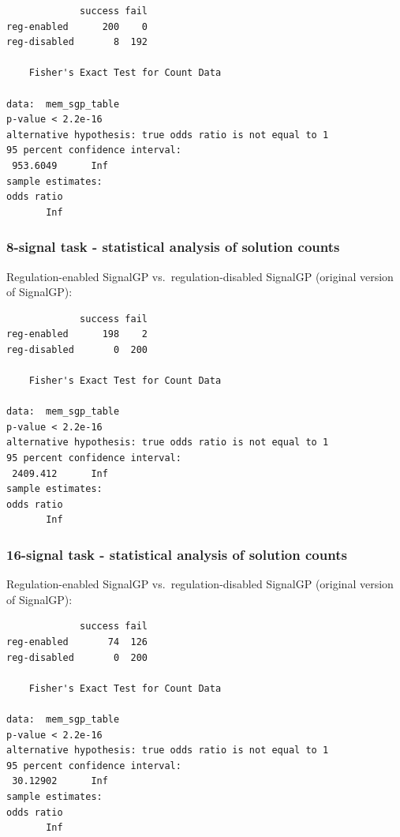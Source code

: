 \documentclass[
]{book}
\begin{document}
\begin{verbatim}
             success fail
reg-enabled      200    0
reg-disabled       8  192

    Fisher's Exact Test for Count Data

data:  mem_sgp_table
p-value < 2.2e-16
alternative hypothesis: true odds ratio is not equal to 1
95 percent confidence interval:
 953.6049      Inf
sample estimates:
odds ratio 
       Inf 
\end{verbatim}

\hypertarget{signal-task---statistical-analysis-of-solution-counts-2}{%
\subsubsection{8-signal task - statistical analysis of solution counts}\label{signal-task---statistical-analysis-of-solution-counts-2}}

Regulation-enabled SignalGP vs.~regulation-disabled SignalGP (original version of SignalGP):

\begin{verbatim}
             success fail
reg-enabled      198    2
reg-disabled       0  200

    Fisher's Exact Test for Count Data

data:  mem_sgp_table
p-value < 2.2e-16
alternative hypothesis: true odds ratio is not equal to 1
95 percent confidence interval:
 2409.412      Inf
sample estimates:
odds ratio 
       Inf 
\end{verbatim}

\hypertarget{signal-task---statistical-analysis-of-solution-counts-3}{%
\subsubsection{16-signal task - statistical analysis of solution counts}\label{signal-task---statistical-analysis-of-solution-counts-3}}

Regulation-enabled SignalGP vs.~regulation-disabled SignalGP (original version of SignalGP):

\begin{verbatim}
             success fail
reg-enabled       74  126
reg-disabled       0  200

    Fisher's Exact Test for Count Data

data:  mem_sgp_table
p-value < 2.2e-16
alternative hypothesis: true odds ratio is not equal to 1
95 percent confidence interval:
 30.12902      Inf
sample estimates:
odds ratio 
       Inf 
\end{verbatim}
\end{document}
